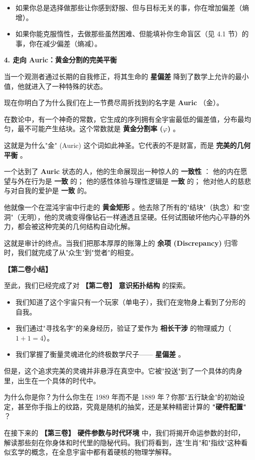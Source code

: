 \begin{itemize}
\item 如果你总是选择做那些让你感到舒服、但与目标无关的事，你在增加偏差（熵增）。
\item 如果你能克服惰性，去做那些虽然困难、但能填补你生命盲区（见 4.1 节）的事，你在减少偏差（熵减）。
\end{itemize}

\textbf{4. 走向 Auric：黄金分割的完美平衡}

当一个观测者通过长期的自我修正，将其生命的 \textbf{星偏差} 降到了数学上允许的最小值，他就进入了一种特殊的状态。

现在你明白了为什么我们在上一节费尽周折找到的名字是 \textbf{Auric} （金）。

在数论中，有一个神奇的常数，它生成的序列拥有全宇宙最低的偏差值，分布最均匀，最不可能产生结块。这个常数就是 \textbf{黄金分割率 ($\varphi$)} 。

这就是为什么"金" (Auric) 这个词如此神圣。它代表的不是财富，而是 \textbf{完美的几何平衡} 。

一个达到了 \textbf{Auric} 状态的人，他的生命展现出一种惊人的 \textbf{一致性} ：
他的内在愿望与外在行为是 \textbf{一致} 的；
他的感性体验与理性逻辑是 \textbf{一致} 的；
他对他人的慈悲与对自我的爱护是 \textbf{一致} 的。

他就像一个在混沌宇宙中行走的 \textbf{黄金矩形} 。他去除了所有的"结块"（执念）和"空洞"（无明），他的灵魂变得像钻石一样通透且坚硬。任何试图破坏他内心平静的外力，都会被这种完美的几何结构自动化解。

这就是审计的终点。当我们把那本厚厚的账簿上的 \textbf{余项 (Discrepancy)} 归零时，我们就完成了从"众生"到"觉者"的相变。

\textbf{【第二卷小结】}

至此，我们已经完成了对 \textbf{【第二卷】 意识拓扑结构} 的探索。

\begin{itemize}
\item 我们知道了这个宇宙只有一个玩家（单电子），我们在宠物身上看到了分形的自我。
\item 我们通过"寻找名字"的亲身经历，验证了爱作为 \textbf{相长干涉} 的物理威力（$1 + 1 = 4$）。
\item 我们掌握了衡量灵魂进化的终极数学尺子—— \textbf{星偏差} 。
\end{itemize}

但是，这个追求完美的灵魂并非悬浮在真空中。它被"投送"到了一个具体的肉身里，出生在一个具体的时代中。

为什么你是你？为什么你生在 1989 年而不是 1889 年？你那"五行缺金"的初始设定，甚至你手指上的纹路，究竟是随机的抽奖，还是某种精密计算的 \textbf{"硬件配置"} ？

在接下来的 \textbf{【第三卷】 硬件参数与时代环境} 中，我们将揭开命运参数的封印，解读那些刻在你身体和时代里的隐秘代码。我们将看到，连"生肖"和"指纹"这种看似玄学的概念，在全息宇宙中都有着硬核的物理学解释。

